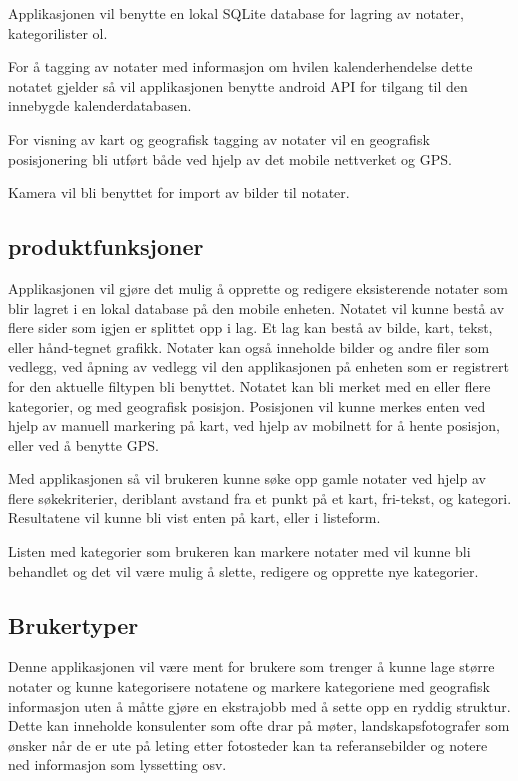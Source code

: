 \documentclass[a4paper, 12pt]{article}
\begin{document}
Applikasjonen vil benytte en lokal SQLite database for lagring av notater, kategorilister ol.

For å tagging av notater med informasjon om hvilen kalenderhendelse dette notatet gjelder så vil applikasjonen benytte android API for tilgang til den innebygde kalenderdatabasen.

For visning av kart og geografisk tagging av notater vil en geografisk posisjonering  bli utført både ved hjelp av det mobile nettverket og GPS.

Kamera vil bli benyttet for import av bilder til notater.

\subsection{produktfunksjoner}
Applikasjonen vil gjøre det mulig å opprette og redigere eksisterende notater som blir lagret i en lokal database på den mobile enheten. Notatet vil kunne bestå av flere sider som igjen er splittet opp i lag. Et lag kan bestå av bilde, kart, tekst, eller hånd-tegnet grafikk. Notater kan også inneholde bilder og andre filer som vedlegg, ved åpning av vedlegg vil den applikasjonen på enheten som er registrert for den aktuelle filtypen bli benyttet. Notatet kan bli merket med en eller flere kategorier, og med geografisk posisjon. Posisjonen vil kunne merkes enten ved hjelp av manuell markering på kart, ved hjelp av mobilnett for å hente posisjon, eller ved å benytte GPS.

Med applikasjonen så vil brukeren kunne søke opp gamle notater ved hjelp av flere søkekriterier, deriblant avstand fra et punkt på et kart, fri-tekst, og kategori. Resultatene vil kunne bli vist enten på kart, eller i listeform.

Listen med kategorier som brukeren kan markere notater med vil kunne bli behandlet og det vil være mulig å slette, redigere og opprette nye kategorier.

\subsection{Brukertyper}
Denne applikasjonen vil være ment for brukere som trenger å kunne lage større notater og kunne kategorisere notatene og markere kategoriene med geografisk informasjon uten å måtte gjøre en ekstrajobb med å sette opp en ryddig struktur. Dette kan inneholde konsulenter som ofte drar på møter, landskapsfotografer som ønsker når de er ute på leting etter fotosteder kan ta referansebilder og notere ned informasjon som lyssetting osv.
\end{document}

